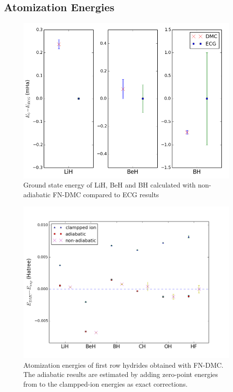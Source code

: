 \documentclass[pra,superscriptaddress,groupedaddress,twocolumn]{revtex4}
\begin{document}


\subsection{Atomization Energies}

\begin{figure}
\includegraphics[scale=.4]{Figures/dia-ECG}
\caption{Ground state energy of LiH, BeH and BH calculated with non-adiabatic FN-DMC compared to ECG results}
\end{figure}

\begin{figure}
\includegraphics[scale=.4]{Figures/atomization}
\caption{Atomization energies of first row hydrides obtained with FN-DMC. The adiabatic results are estimated by adding zero-point energies from \cite{Feller_Corrections} to the clampped-ion energies as exact corrections.}
\end{figure}
\end{document}

